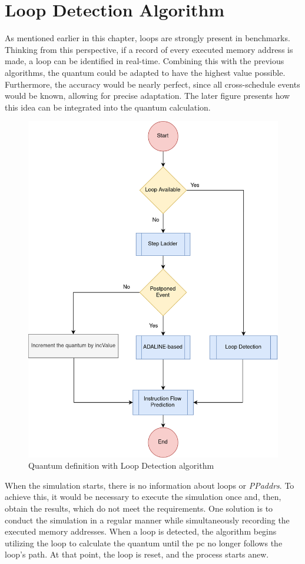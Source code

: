 \section{Loop Detection Algorithm}

As mentioned earlier in this chapter, loops are strongly present in benchmarks. Thinking from this perspective, if a record of every executed 
memory address is made, a loop can be identified in real-time. Combining this with the previous algorithms, the quantum could be adapted  
to have the highest value possible. Furthermore, the accuracy would be nearly perfect, since all cross-schedule events would be known, allowing 
for precise adaptation. The later figure presents how this idea can be integrated into the quantum calculation.


\begin{figure}[h!]
	\centering
 	\includegraphics[width=0.55\linewidth]{Images/ADA_and_REP.png}
 	\caption{Quantum definition with Loop Detection algorithm}
	 \label{fig_ADA_and_REP}
\end{figure}


When the simulation starts, there is no information about loops or \textit{PPaddrs}. To achieve this, it would be necessary to execute the simulation 
once and, then, obtain the results, which do not meet the requirements. One solution is to conduct the simulation in a regular manner while 
simultaneously recording the executed memory addresses. When a loop is detected, the algorithm begins utilizing the loop to calculate the quantum 
until the \gls{pc} no longer follows the loop's path. At that point, the loop is reset, and the process starts anew.

